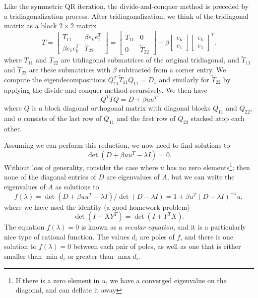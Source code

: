 \documentclass[12pt, leqno]{article} %
\begin{document}
Like the symmetric QR iteration, the divide-and-conquer method is
preceded by a tridiagonalization process.  After tridiagonalization,
we think of the tridiagonal matrix as a block $2 \times 2$ matrix
\[
  T =
  \begin{bmatrix}
    T_{11} & \beta e_{k} e_1^T \\
    \beta e_1 e_{k}^T & T_{22}
  \end{bmatrix} =
  \begin{bmatrix}
    \tilde{T}_{11} & 0 \\ 0 & \tilde{T}_{22}
  \end{bmatrix} +
  \beta
  \begin{bmatrix} e_k \\ e_1 \end{bmatrix}
  \begin{bmatrix} e_k \\ e_1 \end{bmatrix}^T.
\]
where $T_{11}$ and $T_{22}$ are tridiagonal submatrices of the original
tridiagonal, and $\tilde{T}_{11}$ and $\tilde{T}_{22}$ are these
submatrices with $\beta$ subtracted from a corner entry.  We compute
the eigendecompositions $Q_{11}^T \tilde{T}_{11} Q_{11} = D_1$ and
similarly for $\tilde{T}_{22}$ by applying the divide-and-conquer
method recursively.  We then have
\[
  Q^T T Q = D + \beta uu^T
\]
where $Q$ is a block diagonal orthogonal matrix with diagonal blocks
$Q_{11}$ and $Q_{22}$, and $u$ consists of the last row of $Q_{11}$
and the first row of $Q_{22}$ stacked atop each other.

Assuming we can perform this reduction, we now need to find
solutions to
\[
  \det(D + \beta uu^T - \lambda I) = 0.
\]
Without loss of generality, consider the case where $u$ has no zero
elements\footnote{%
If there is a zero element in $u$, we have a converged eigenvalue on
the diagonal, and can deflate it away}; then none of the diagonal
entries of $D$ are eigenvalues of $A$, but we can write the eigenvalues
of $A$ as solutions to
\[
  f(\lambda) = \det(D + \beta uu^T - \lambda I) / \det(D - \lambda I)
  = 1 + \beta u^T (D-\lambda I)^{-1} u,
\]
where we have used the identity (a good homework problem)
\[
  \det(I+XY^T) = \det(I+Y^T X).
\]
The equation $f(\lambda) = 0$ is known as a {\em secular equation},
and it is a particularly nice type of rational function.  The values
$d_i$ are poles of $f$, and there is one solution to $f(\lambda) = 0$
between each pair of poles, as well as one that is either smaller
than $\min d_i$ or greater than $\max d_i$.
\end{document}
